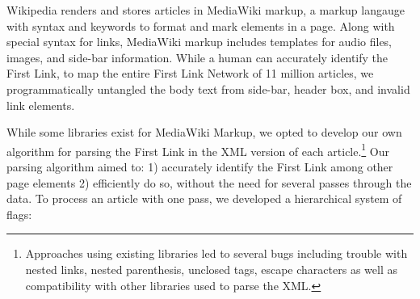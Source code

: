 \documentclass[twoside]{article}
\begin{document}
Wikipedia renders and stores articles in MediaWiki markup, a markup langauge with syntax and keywords to format and mark elements in a page. Along with special syntax for links, MediaWiki markup includes templates for audio files, images, and side-bar
information.
While a human can accurately identify the First Link, to map the entire First Link Network of 11 million articles, we programmatically untangled the body text from side-bar, header box, and invalid link elements.

While some libraries exist for MediaWiki Markup, we opted to develop our own algorithm for parsing the First Link in the XML version of each article.\footnote{
Approaches using existing libraries led to several bugs 
including trouble with nested links, nested parenthesis, unclosed tags, escape characters 
as well as compatibility with other libraries used to parse the XML.}
Our parsing algorithm aimed to: 
1) accurately identify the First Link among other page elements
2) efficiently do so, without the need for several passes through the data.
To process an article with one pass, we developed a hierarchical system of flags:
\end{document}

